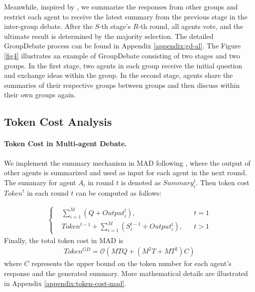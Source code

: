 Meanwhile, inspired by \cite{sun2023corex}, we summarize the responses from other groups and restrict each agent to receive the latest summary from the previous stage in the inter-group debate.
After the $S$-th stage's $R$-th round, all agents vote, and the ultimate result is determined by the majority selection. The detailed GroupDebate process can be found in Appendix \ref{appendix:gd-al}. The Figure \ref{fig4} illustrates an example of GroupDebate consisting of two stages and two groups. In the first stage, two agents in each group receive the initial question and exchange ideas within the group. In the second stage, agents share the summaries of their respective groups between groups and then discuss within their own groups again.


\subsection{Token Cost Analysis} \label{token-consumption-analysis}

\paragraph{Token Cost in Multi-agent Debate.} 

We implement the summary mechanism in MAD following \cite{du2023improving}, where the output of other agents is summarized and used as input for each agent in the next round. The summary for agent $A_i$ in round $t$ is denoted as $Summary_i^t$. 
Then token cost $Token^t$ in each round $t$ can be computed as follows:

\begin{equation}
\begin{split}
\left\{
\begin{aligned}
& \sum_{i=1}^M (Q+Output_i^t),   &&{t=1} \\
& Token^{t-1}+\sum_{i=1}^{M}(S_{i}^{t-1}+  Output_{i}^{t}),   &&{t>1}
\end{aligned}
\right.
\end{split}
\end{equation}
Finally, the total token cost in MAD is 
\begin{align}
Token^{GD} = \mathcal{O}\left( MTQ+(M^2T+MT^2)C \right)
\end{align}
where $C$ represents the upper bound on the token number for each agent's response and the generated summary. More mathematical details are illustrated in Appendix \ref{appendix:token-cost-mad}.

